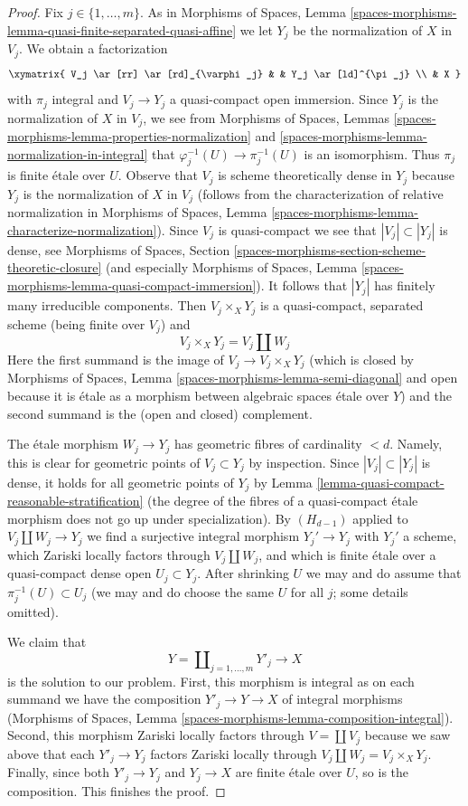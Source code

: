 \begin{proof}
\medskip\noindent
Fix $j \in \{1, \ldots, m\}$.
As in Morphisms of Spaces, Lemma
\ref{spaces-morphisms-lemma-quasi-finite-separated-quasi-affine}
we let $Y_j$ be the normalization of $X$ in $V_j$. We obtain a factorization
$$
\xymatrix{
V_j \ar[rr] \ar[rd]_{\varphi_j} & & Y_j \ar[ld]^{\pi_j} \\
& X
}
$$
with $\pi_j$ integral and $V_j \to Y_j$ a quasi-compact open immersion. Since
$Y_j$ is the normalization of $X$ in $V_j$, we see from
Morphisms of Spaces, Lemmas
\ref{spaces-morphisms-lemma-properties-normalization} and
\ref{spaces-morphisms-lemma-normalization-in-integral}
that $\varphi_j^{-1}(U) \to \pi_j^{-1}(U)$ is an isomorphism.
Thus $\pi_j$ is finite \'etale over $U$. Observe that $V_j$
is scheme theoretically dense in $Y_j$ because $Y_j$ is the normalization
of $X$ in $V_j$ (follows from the characterization of relative normalization
in Morphisms of Spaces, Lemma
\ref{spaces-morphisms-lemma-characterize-normalization}). Since $V_j$
is quasi-compact we see that $|V_j| \subset |Y_j|$ is dense,
see Morphisms of Spaces, Section
\ref{spaces-morphisms-section-scheme-theoretic-closure}
(and especially Morphisms of Spaces, Lemma
\ref{spaces-morphisms-lemma-quasi-compact-immersion}).
It follows that $|Y_j|$ has finitely many irreducible components.
Then $V_j \times_X Y_j$ is a quasi-compact, separated scheme
(being finite over $V_j$) and
$$
V_j \times_X Y_j = V_j \amalg W_j
$$
Here the first summand is the image of $V_j \to V_j \times_X Y_j$
(which is closed by
Morphisms of Spaces, Lemma \ref{spaces-morphisms-lemma-semi-diagonal}
and open because it is \'etale as a morphism between
algebraic spaces \'etale over $Y$) and
the second summand is the (open and closed) complement.

\medskip\noindent
The \'etale morphism $W_j \to Y_j$ has geometric fibres of cardinality $< d$.
Namely, this is clear for geometric points of $V_j \subset Y_j$ by inspection.
Since $|V_j| \subset |Y_j|$ is dense, it holds for all geometric points
of $Y_j$ by Lemma \ref{lemma-quasi-compact-reasonable-stratification}
(the degree of the fibres of a quasi-compact \'etale morphism
does not go up under specialization). By $(H_{d - 1})$ applied
to $V_j \amalg W_j \to Y_j$ we find a surjective integral morphism
$Y_j' \to Y_j$ with $Y_j'$ a scheme, which Zariski locally factors
through $V_j \amalg W_j$, and which is finite \'etale over a
quasi-compact dense open $U_j \subset Y_j$. After shrinking $U$
we may and do assume that $\pi_j^{-1}(U) \subset U_j$
(we may and do choose the same $U$ for all $j$; some details omitted).

\medskip\noindent
We claim that
$$
Y = \coprod\nolimits_{j = 1, \ldots, m} Y'_j \longrightarrow X
$$
is the solution to our problem. First, this morphism is integral
as on each summand we have the composition $Y'_j \to Y \to X$
of integral morphisms (Morphisms of Spaces, Lemma
\ref{spaces-morphisms-lemma-composition-integral}). Second, this
morphism Zariski locally factors through $V = \coprod V_j$ because
we saw above that each $Y'_j \to Y_j$ factors Zariski locally through
$V_j \amalg W_j = V_j \times_X Y_j$. Finally, since both
$Y'_j \to Y_j$ and $Y_j \to X$ are finite \'etale over
$U$, so is the composition. This finishes the proof.
\end{proof}
